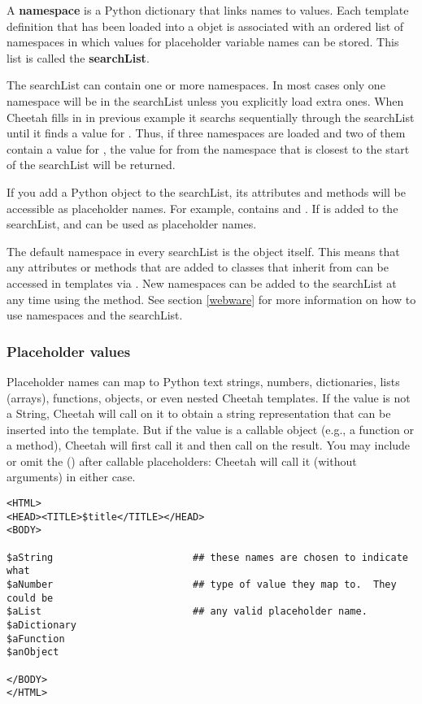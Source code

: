 A {\bf namespace} is a Python dictionary that links names to values. Each
template definition that has been loaded into a  objet is
associated with an ordered list of namespaces in which values for placeholder
variable names can be stored.  This list is called the {\bf searchList}.

The searchList can contain one or more namespaces.  In most cases only one
namespace will be in the searchList unless you explicitly load extra ones.  When
Cheetah fills in  in previous example it searchs
sequentially through the searchList until it finds a value for .
Thus, if three namespaces are loaded and two of them contain a value for
, the value for  from the namespace that is
closest to the start of the searchList will be returned.

If you add a Python object to the searchList, its attributes and methods will be
accessible as placeholder names.  For example,  contains
 and .  If  is added to the
searchList,  and  can be used as placeholder
names.  

The default namespace in every searchList is the  object itself.
This means that any attributes or methods that are added to classes that inherit
from  can be accessed in templates via .  New
namespaces can be added to the searchList at any time using the
 method.  See section \ref{webware} for more
information on how to use namespaces and the searchList.

\subsubsection{Placeholder values}

Placeholder names can map to Python text strings, numbers, dictionaries, lists
(arrays), functions, objects, or even nested Cheetah templates.  If the value is
not a String, Cheetah will call  on it to obtain a string
representation that can be inserted into the template.  But if the value is a
callable object (e.g., a function or a method), Cheetah will first call it and
then call  on the result.  You may include or omit the () after
callable placeholders: Cheetah will call it (without arguments) in either case.


\begin{verbatim}
<HTML>
<HEAD><TITLE>$title</TITLE></HEAD>
<BODY>

$aString                        ## these names are chosen to indicate what
$aNumber                        ## type of value they map to.  They could be
$aList                          ## any valid placeholder name.
$aDictionary
$aFunction
$anObject

</BODY>
</HTML>
\end{verbatim}

